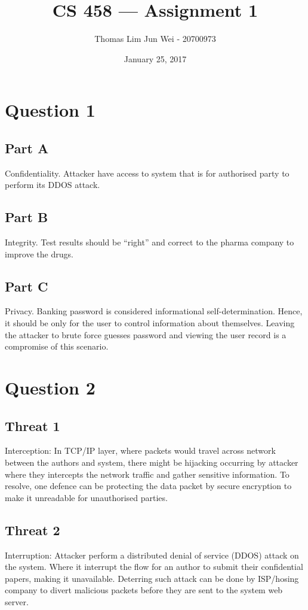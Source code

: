 \documentclass[12pt]{article}
\title{CS 458 --- Assignment 1}
\author{Thomas Lim Jun Wei - 20700973}
\date{January 25, 2017}
\begin{document}
\maketitle

\section*{Question 1}
\subsection*{Part A}
Confidentiality. Attacker have access to system that is for authorised party to perform its DDOS attack.

\subsection*{Part B}
Integrity. Test results should be “right” and correct to the pharma company to improve the drugs.

\subsection*{Part C}
Privacy. Banking password is considered informational self-determination. Hence, it should be only for the user to control information about themselves. Leaving the attacker to brute force guesses password and viewing the user record is a compromise of this scenario.


\section*{Question 2}
\subsection*{Threat 1}
Interception: In TCP/IP layer, where packets would travel across network between the authors and system, there might be hijacking occurring by attacker where they intercepts the network traffic and gather sensitive information. To resolve, one defence  can be protecting the data packet by secure encryption to make it unreadable for unauthorised parties.

\subsection*{Threat 2}
Interruption: Attacker perform a distributed denial of service (DDOS) attack on the system. Where it interrupt the flow for an author to submit their confidential papers, making it unavailable. Deterring such attack can be done by ISP/hosing company to divert malicious packets before they are sent to the system web server.
\end{document}
